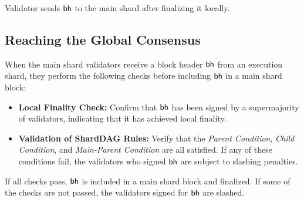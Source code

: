 Validator sends $\mathsf{bh}$ to the main shard after finalizing
it locally.

\subsection{Reaching the Global Consensus}
\label{sec:globalconsensus}

When the main shard validators receive a block header $\mathsf{bh}$ from an
execution shard, they perform the following checks before including
$\mathsf{bh}$ in a main shard block:

\begin{itemize}
	\item \textbf{Local Finality Check:} Confirm that $\mathsf{bh}$ has
	      been signed by a supermajority of validators, indicating
	      that it has achieved local finality.
	\item \textbf{Validation of ShardDAG Rules:} Verify that the
	      \emph{Parent Condition}, \emph{Child Condition}, and
	      \emph{Main-Parent
		      Condition} are all satisfied. If
	      any of these conditions fail, the validators who signed
	      $\mathsf{bh}$ are subject to slashing penalties.
\end{itemize}

If all checks pass, $\mathsf{bh}$ is included in a main shard block and
finalized. If some of the checks are not passed, the validators signed for
$\mathsf{bh}$ are slashed.


%
%

